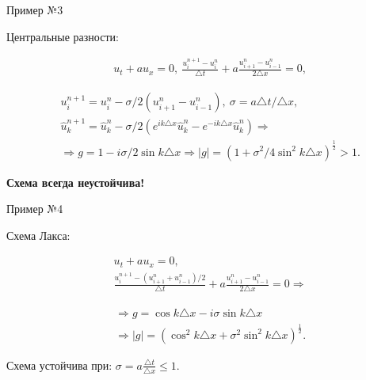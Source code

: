 \documentclass[12pt,xcolor=pst,aspectratio=169]{beamer}
\begin{document}
\begin{frame}{Пример №3}

	\transdissolve[duration=0.1]
	\justifying
	\large

	Центральные разности:

	\[
		\begin{split}
			&u_{t} + a u_{x} = 0 , \: \frac{u^{n + 1}_{i} - u^{n}_{i}}{\triangle t} + a \frac{u^{n}_{i + 1} - u^{n}_{i - 1}}{2 \triangle x} = 0,
		\end{split}
	\]

	\pause

	\[
		\begin{split}
			&u^{n + 1}_{i} = u^{n}_{i} - \sigma / 2 \left( u^{n}_{i + 1} - u^{n}_{i - 1} \right), \: \sigma = a \triangle t / \triangle x, \\
			&\hat{u}^{n + 1}_{k} = \hat{u}^{n}_{k} - \sigma / 2 \left( e^{i k \triangle x} \hat{u}^{n}_{k} - e^{- i k \triangle x} \hat{u}^{n}_{k} \right) \Rightarrow \\
			& \Rightarrow g = 1 - i \sigma / 2 \sin k \triangle x \Rightarrow |g| = \left( 1 + \sigma^{2} / 4 \sin^{2} k \triangle x \right)^{\frac{1}{2}} > 1 .
		\end{split}
	\]

    \textbf{Схема всегда неустойчива!}\\

\end{frame}

\begin{frame}{Пример №4}

	\transdissolve[duration=0.1]
	\justifying
	\large

	Схема Лакса:

	\[
		\begin{split}
			&u_{t} + a u_{x} = 0 , \\
			&\frac{u^{n + 1}_{i} - (u^{n}_{i+1} + u^{n}_{i-1})/2}{\triangle t} + a \frac{u^{n}_{i + 1} - u^{n}_{i - 1}}{2 \triangle x} = 0 \Rightarrow
		\end{split}
	\]

	\pause

	\[
		\begin{split}
			& \Rightarrow g = \cos k \triangle x - i \sigma \sin k \triangle x \\
			& \Rightarrow |g| = \left( \cos^{2} k \triangle x + \sigma^{2} \sin^{2} k \triangle x \right)^{\frac{1}{2}} .
		\end{split}
	\]

    Схема устойчива при: $\sigma = a \frac{\triangle t}{\triangle x} \leq 1$.\\

\end{frame}
\end{document}
